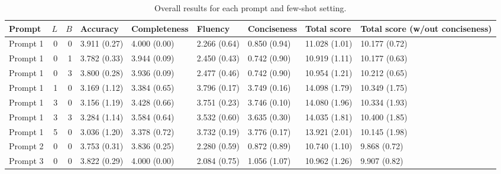 \begin{table}
\caption{Overall results for each prompt and few-shot setting.}
\begin{tabular}{lrrllllll}
\toprule
Prompt & $L$ & $B$ & Accuracy & Completeness & Fluency & Conciseness & Total score & Total score (w/out conciseness) \\
\midrule
Prompt 1 & 0 & 0 & 3.911 (0.27) & 4.000 (0.00) & 2.266 (0.64) & 0.850 (0.94) & 11.028 (1.01) & 10.177 (0.72) \\
Prompt 1 & 0 & 1 & 3.782 (0.33) & 3.944 (0.09) & 2.450 (0.43) & 0.742 (0.90) & 10.919 (1.11) & 10.177 (0.63) \\
Prompt 1 & 0 & 3 & 3.800 (0.28) & 3.936 (0.09) & 2.477 (0.46) & 0.742 (0.90) & 10.954 (1.21) & 10.212 (0.65) \\
Prompt 1 & 1 & 0 & 3.169 (1.12) & 3.384 (0.65) & 3.796 (0.17) & 3.749 (0.16) & 14.098 (1.79) & 10.349 (1.75) \\
Prompt 1 & 3 & 0 & 3.156 (1.19) & 3.428 (0.66) & 3.751 (0.23) & 3.746 (0.10) & 14.080 (1.96) & 10.334 (1.93) \\
Prompt 1 & 3 & 3 & 3.284 (1.14) & 3.584 (0.64) & 3.532 (0.60) & 3.635 (0.30) & 14.035 (1.81) & 10.400 (1.85) \\
Prompt 1 & 5 & 0 & 3.036 (1.20) & 3.378 (0.72) & 3.732 (0.19) & 3.776 (0.17) & 13.921 (2.01) & 10.145 (1.98) \\
Prompt 2 & 0 & 0 & 3.753 (0.31) & 3.836 (0.25) & 2.280 (0.59) & 0.872 (0.89) & 10.740 (1.10) & 9.868 (0.72) \\
Prompt 3 & 0 & 0 & 3.822 (0.29) & 4.000 (0.00) & 2.084 (0.75) & 1.056 (1.07) & 10.962 (1.26) & 9.907 (0.82) \\
\bottomrule
\end{tabular}
\end{table}
